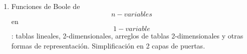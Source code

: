 \begin{enumerate}
\begin{enumerate}
\begin{enumerate}
\begin{enumerate}
        \[\begin{matrix}
        {a{: = 1}b{: = 0}} \\
        \begin{bmatrix}
        {c = 0} & {{{1 \cdot 0} = {0 \cdot 1}} = 0} & {{{1 \cdot 1} = {1 + 1}} = 1} \\
        {{{1 \cdot 0} = {0 \cdot 1}} = 0} & {d = 1} & {{{1 \cdot 1} = {1 + 1}} = 1}
        \end{bmatrix}
        \end{matrix}\]

        \[\mathtt{{\mathrm{P}_{2 \times 2}}^{\mathbf{\mathrm{T}}}} = \begin{pmatrix}
        1 & 0 \\
        0 & 1
        \end{pmatrix}\]

        \[\mathtt{\mathrm{H}^{\mathbf{\mathrm{\ast}}}} = \begin{pmatrix}
        1 & 0 & 1 & 0 \\
        0 & 1 & 0 & 1
        \end{pmatrix}\]

        \[\mathtt{\mathrm{H}} = \begin{pmatrix}
        1 & 0 \\
        0 & 1 \\
        1 & 0 \\
        0 & 1
        \end{pmatrix}\]

        \[\begin{pmatrix}
        0 & 1 & 0 & 1 \\
        0 & 0 & 1 & 1
        \end{pmatrix}\rightarrow\begin{pmatrix}
        0 & 1 & 0 & 1 \\
        0 & 0 & 1 & 1 \\
        0 & 1 & 0 & 1 \\
        0 & 0 & 1 & 1
        \end{pmatrix}\]
      \end{enumerate}
    \end{enumerate}
  \end{enumerate}
\item
  Funciones de Boole de \[n - \mathit{variables}\] en
  \[1 - \mathit{variable}\]: tablas lineales, 2-dimensiona\-les,
  arreglos de tablas 2-dimensionales y otras formas de representación.
  Simplificación en 2 capas de puertas.
\end{enumerate}
